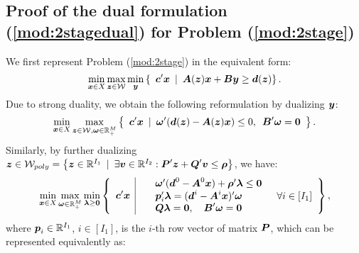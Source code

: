 \documentclass[fleqn,orsc,blindrev]{informs4}
\newcommand{\mb}[1]{\mbox{\boldmath \ensuremath{#1}}}
\begin{document}
\begin{appendices}
	\section{Proof of the dual formulation (\ref{mod:2stagedual}) for  Problem (\ref{mod:2stage})  \label{proof:primaldual}} 
	We first represent Problem (\ref{mod:2stage}) in the equivalent form:
\begin{equation*}
		\min_{\boldsymbol{x} \in X} \max_{\boldsymbol{z} \in \mathcal{W}} \min_{\boldsymbol{y}}\left\{ \enskip \mb{c}'\mb{x} \enskip | \enskip  \mb{A}(\mb{z})\mb{x}+\mb{B}\mb{y} \geq\mb{d}(\mb{z}) \right\}.
\end{equation*}
	Due to strong duality, we obtain the following reformulation by dualizing $\mb{y}$:
\begin{equation*}
	\min_{\boldsymbol{x} \in X} \max_{\boldsymbol{z} \in \mathcal{W}, \boldsymbol{\omega} \in \mathbb{R}^{M}_+} \left\{ \enskip\mb{c}'\mb{x}  \enskip | \enskip  \mb{\omega}'(\mb{d}(\mb{z}) -\mb{A}(\mb{z})\mb{x}) \le 0, \enskip \mb{B}'\mb{\omega} =\mb{0} \enskip \right\}.
\end{equation*}
	Similarly, by further dualizing $\boldsymbol{z}\in \mathcal{W}_{poly} = \left\{\mb{z}\in \mathbb{R}^{I_1} \enskip |\enskip \exists \mb{v} \in \mathbb{R}^{I_2}: \mb{P}'\mb{z} + \mb{Q}'\mb{v} \le \mb{\rho} \right\}$, we have:
\begin{equation*}
	\min_{\boldsymbol{x} \in X} \max_{ \boldsymbol{\omega} \in \mathbb{R}^{M}_+} \min_{\boldsymbol{\lambda} \ge \boldsymbol{0}} \left\{ \enskip\mb{c}'\mb{x} \enskip \vline \enskip \begin{array}{lll}
	&  \mb{\omega}' (\mb{d}^0 -\mb{A}^0\mb{x}) + \mb{\rho}'\mb{\lambda} \le \mb{0} \\
	&\mb{p}_i'\mb{\lambda} = (\mb{d}^i- \mb{A}^i\mb{x})'\mb{\omega} &  \enskip \forall i\in [I_1]\\
	&\displaystyle  \mb{Q}\mb{\lambda} = \mb{0}, \quad  \mb{B}'\mb{\omega} =\mb{0} \\
	\end{array}
	\right\},
\end{equation*}
where $\mb{p}_i\in \mathbb{R}^{I_1}$, $i\in [I_1]$, is the $i$-th row vector of matrix $\mb{P}$, which can be represented equivalently as:


\end{appendices}
\end{document}
